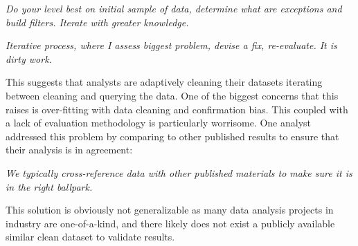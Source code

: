 \vspace{0.5em}
\emph{Do your level best on initial sample of data, determine what are exceptions and build filters. Iterate with greater knowledge.}

\vspace{0.5em}
\emph{Iterative process, where I assess biggest problem, devise a fix, re-evaluate. It is dirty work.}

\vspace{0.5em}

This suggests that analysts are adaptively cleaning their datasets iterating between cleaning and querying the data. One of the biggest concerns that this raises is over-fitting with data cleaning and confirmation bias. This coupled with a lack of evaluation methodology is particularly worrisome. One analyst addressed this problem by comparing to other published results to ensure that their analysis is in agreement:

\vspace{0.5em}
\emph{We typically cross-reference data with other published materials to make sure it is in the right ballpark.}
\vspace{0.5em}

This solution is obviously not generalizable as many data analysis projects in industry are one-of-a-kind, and there likely does not exist a publicly available similar clean dataset to validate results.